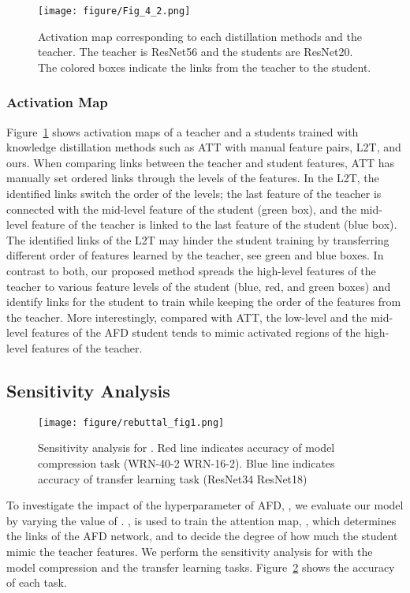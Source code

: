 \begin{figure}[h]
    \centering
    \texttt{[image: figure/Fig\_4\_2.png]}
    \caption{Activation map corresponding to each distillation methods and the teacher. The teacher is ResNet56 and the students are ResNet20. The colored boxes indicate the links from the teacher to the student.}
    \label{fig:activation_map}
\end{figure}

\subsubsection{Activation Map}
Figure~\ref{fig:activation_map} shows activation maps of a teacher and a students trained with knowledge distillation methods such as ATT with manual feature pairs, L2T, and ours. When comparing links between the teacher and student features, ATT has manually set ordered links through the levels of the features. In the L2T, the identified links switch the order of the levels; the last feature of the teacher is connected with the mid-level feature of the student (green box), and the mid-level feature of the teacher is linked to the last feature of the student (blue box). 
The identified links of the L2T may hinder the student training by transferring different order of features learned by the teacher, see green and blue boxes.
In contrast to both, our proposed method spreads the high-level features of the teacher to various feature levels of the student (blue, red, and green boxes) and identify links for the student to train while keeping the order of the features from the teacher.
More interestingly, compared with ATT, the low-level and the mid-level features of the AFD student tends to mimic activated regions of the high-level features of the teacher. 

\subsection{Sensitivity Analysis}
\begin{figure}[h]
    \centering
    \texttt{[image: figure/rebuttal\_fig1.png]}
    \caption{Sensitivity analysis for . Red line indicates accuracy of model compression task (WRN-40-2  WRN-16-2). Blue line indicates accuracy of transfer learning task (ResNet34  ResNet18)}
    \label{fig:sensitivity}
\end{figure}

To investigate the impact of the hyperparameter of AFD, , we evaluate our model by varying the value of . , is used to train the attention map, , which determines the links of the AFD network, and to decide the degree of how much the student mimic the teacher features. We perform the sensitivity analysis for  with the model compression and the transfer learning tasks. Figure~\ref{fig:sensitivity} shows the accuracy of each task.

